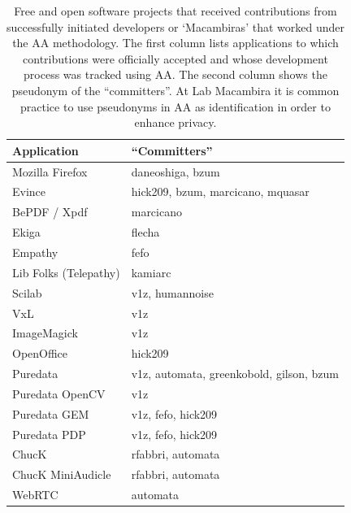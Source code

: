 \documentclass{article}
\begin{document}
\begin{table}
  \caption{Free and open software projects that received contributions from
  successfully initiated developers  or `Macambiras' that worked under the AA
  methodology. The first column lists applications to which contributions were
  officially accepted and whose development process was tracked using AA. The
  second column shows the pseudonym of the ``committers''. At Lab Macambira it is
  common practice to use pseudonyms in AA as identification in order to enhance
  privacy.}
  \begin{center}
  \small\begin{tabular}{|l|l|}
        \hline
        Application           & ``Committers''                       \\
        \hline \hline
        Mozilla Firefox       & daneoshiga, bzum                    \\
        Evince                & hick209, bzum, marcicano, mquasar   \\
        BePDF / Xpdf          & marcicano                           \\
        Ekiga                 & flecha                              \\
        Empathy               & fefo                                \\
        Lib Folks (Telepathy) & kamiarc                             \\
        Scilab                & v1z, humannoise                     \\
        VxL                   & v1z                                 \\
        ImageMagick           & v1z                                 \\
        OpenOffice            & hick209                             \\
        Puredata              & v1z, automata, greenkobold, gilson, bzum \\
        Puredata OpenCV       & v1z                                 \\
        Puredata GEM          & v1z, fefo, hick209                  \\
        Puredata PDP          & v1z, fefo, hick209                  \\
        ChucK                 & rfabbri, automata                   \\
        ChucK MiniAudicle     & rfabbri, automata                   \\
        WebRTC                & automata                            \\

\end{tabular}
\end{center}
\end{table}
\end{document}
